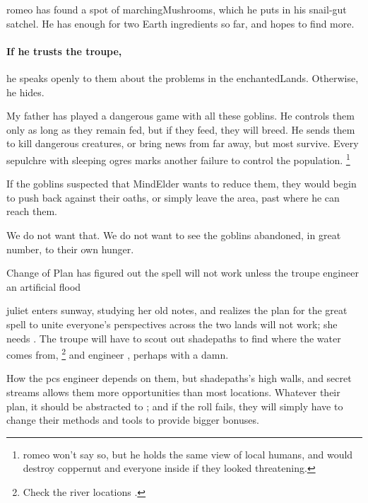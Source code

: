 \begin{multicols}{2}
\Gls{romeo} has found a spot of \glspl{marchingMushroom}, which he puts in his snail-gut satchel.
He has enough for two Earth \glspl{ingredient} so far, and hopes to find more.

\paragraph{If he trusts the troupe,}
he speaks openly to them about the problems in the \gls{enchantedLands}.
Otherwise, he hides.

\begin{speechtext}
  My father has played a dangerous game with all these goblins.
  He controls them only as long as they remain fed, but if they feed, they will breed.
  He sends them to kill dangerous creatures, or bring news from far away, but most survive.
  Every \gls{sepulchre} with sleeping \glspl{ogre} marks another failure to control the population.%
  \footnote{\Gls{romeo} won't say so, but he holds the same view of local humans, and would destroy \gls{coppernut} and everyone inside if they looked threatening.}

  If the goblins suspected that \gls{MindElder} wants to reduce them, they would begin to push back against their oaths, or simply leave the area, past where he can reach them.

  We do not want that.
  We do not want to see the goblins abandoned, in great number, to their own hunger.
\end{speechtext}

{Change of Plan}%
{ has figured out the spell will not work unless the troupe engineer an artificial \gls{flood}}%

\Gls{juliet} enters \gls{sunway}, studying her old notes, and realizes the plan for the great spell to unite everyone's perspectives across the two lands will not work; she needs .
The troupe will have to scout out \gls{shadepaths} to find where the water comes from,%
\footnote{Check the river locations .}
and engineer , perhaps with a damn.

How the \glspl{pc} engineer  depends on them, but \gls{shadepaths}'s high walls, and secret streams allows them more opportunities than most locations.
Whatever their plan, it should be abstracted to ; and if the roll fails, they will simply have to change their methods and tools to provide bigger bonuses.


\end{multicols}
